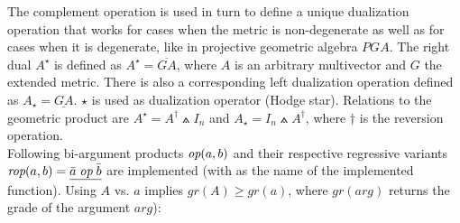 The complement operation is used in turn to define a unique dualization operation that
works for cases when the metric is non-degenerate as well as for cases when it is
degenerate, like in projective geometric algebra $PGA$. The right dual $A^{\star}$ is
defined as $A^{\star} = \overline{GA}$, where $A$ is an arbitrary multivector and $G$ the
extended metric. There is also a corresponding left dualization operation defined as
$A_{\star} = \underline{GA}$. $\star$ is used as dualization operator (Hodge star).
Relations to the geometric product are $A^{\star} = A^{\dagger} \wedgedot I_n$ and
$A_{\star} = I_n \wedgedot A^{\dagger}$, where $\dagger$ is the reversion operation. \\


Following bi-argument products $\emph{op}(a,b)$ and their respective regressive variants
$\emph{rop}(a,b) = \underline{\bar{a} \; \emph{op} \; \bar{b}}$ are implemented (with
 as the name of the implemented function). Using $A$ vs. $a$ implies $gr(A)
\ge gr(a)$, where $gr(arg)$ returns the grade of the argument $arg$):
